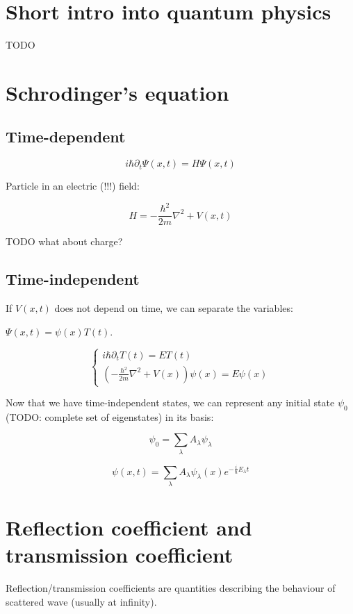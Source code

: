 \documentclass[12pt, a4paper]{article}
\begin{document}
\section{Short intro into quantum physics}
TODO

\section{Schrodinger's equation}

\subsection{Time-dependent}

$$i \hbar \partial_t \Psi(x, t) = H \Psi(x, t)$$

Particle in an electric (!!!) field:

$$H = - \frac{\hbar^2}{2 m} \nabla^2 + V(x, t)$$


TODO what about charge?

\subsection{Time-independent}

If $V(x, t)$ does not depend on time, we can separate the variables:

$\Psi(x, t) = \psi(x) T(t)$.

$$\begin{cases}
i \hbar \partial_t T(t) = E T(t) \\
(- \frac{\hbar^2}{2 m} \nabla^2 + V(x)) \psi(x) = E \psi(x)
\end{cases}$$

Now that we have time-independent states, we can represent any initial state $\psi_0$ (TODO: complete set of eigenstates) in its basis:

$$\psi_0 = \sum\limits_\lambda A_\lambda \psi_\lambda$$

$$\psi(x, t) = \sum\limits_\lambda A_\lambda \psi_\lambda(x) e^{- \frac{i}{\hbar} E_\lambda t}$$

\section{Reflection coefficient and transmission coefficient}
Reflection/transmission coefficients are quantities describing the behaviour of scattered wave (usually at infinity).
\end{document}

